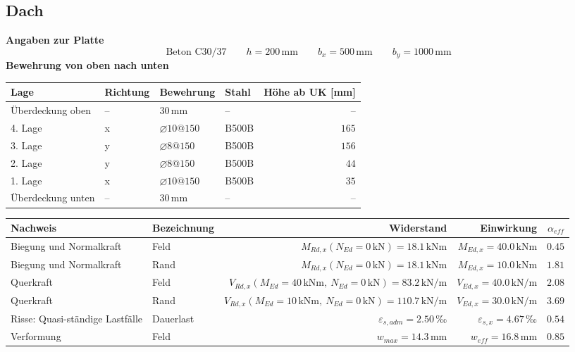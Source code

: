 \documentclass[11pt,a4paper]{article}
\begin{document}
\subsection{Dach}
\noindent\textbf{Angaben zur Platte}
\begin{equation*}
\text{Beton C30/37} \qquad h = 200\,\mathrm{mm} \qquad b_x = 500\,\mathrm{mm} \qquad b_y = 1000\,\mathrm{mm}
\end{equation*}
\noindent\textbf{Bewehrung von oben nach unten}
\begin{longtable}{llllr}
\hline
Lage & Richtung & Bewehrung & Stahl & Höhe ab UK [mm] \\
\hline
\endhead
Überdeckung oben & – & $30\,\mathrm{mm}$ & – & – \\
4. Lage & x & $\varnothing 10@150$ & B500B & $165$ \\
3. Lage & y & $\varnothing 8@150$ & B500B & $156$ \\
2. Lage & y & $\varnothing 8@150$ & B500B & $44$ \\
1. Lage & x & $\varnothing 10@150$ & B500B & $35$ \\
Überdeckung unten & – & $30\,\mathrm{mm}$ & – & – \\
\hline
\end{longtable}
\begin{xltabular}{\linewidth}{>{\raggedright\arraybackslash}X>{\raggedright\arraybackslash}Xrrr}
\hline
Nachweis & Bezeichnung & Widerstand & Einwirkung & $\alpha_{eff}$ \\
\hline
\endhead
Biegung und Normalkraft & Feld & $M_{Rd,x}(N_{Ed} = 0\,\mathrm{kN}) = 18.1\,\mathrm{kNm}$ & $M_{Ed,x} = 40.0\,\mathrm{kNm}$ & $0.45$ \\
Biegung und Normalkraft & Rand & $M_{Rd,x}(N_{Ed} = 0\,\mathrm{kN}) = 18.1\,\mathrm{kNm}$ & $M_{Ed,x} = 10.0\,\mathrm{kNm}$ & $1.81$ \\
Querkraft & Feld & $V_{Rd,x}(M_{Ed} = 40\,\mathrm{kNm},\ N_{Ed} = 0\,\mathrm{kN}) = 83.2\,\mathrm{kN}/\mathrm{m}$ & $V_{Ed,x} = 40.0\,\mathrm{kN}/\mathrm{m}$ & $2.08$ \\
Querkraft & Rand & $V_{Rd,x}(M_{Ed} = 10\,\mathrm{kNm},\ N_{Ed} = 0\,\mathrm{kN}) = 110.7\,\mathrm{kN}/\mathrm{m}$ & $V_{Ed,x} = 30.0\,\mathrm{kN}/\mathrm{m}$ & $3.69$ \\
Risse: Quasi-ständige Lastfälle & Dauerlast & $\varepsilon_{s,adm} = 2.50\,\text{‰}$ & $\varepsilon_{s,x} = 4.67\,\text{‰}$ & $0.54$ \\
Verformung & Feld & $w_{max} = 14.3\,\mathrm{mm}$ & $w_{eff} = 16.8\,\mathrm{mm}$ & $0.85$ \\
\hline
\end{xltabular}
\end{document}
